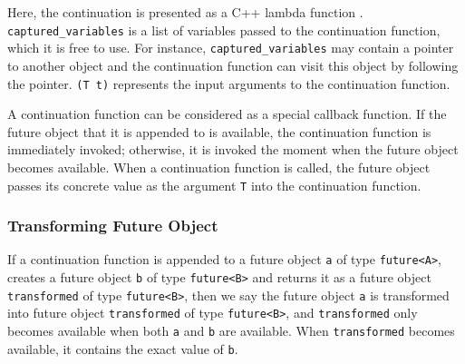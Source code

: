 \noindent Here, the continuation is presented as a C++ lambda function \cite{cpplambda}. \lstinline[style=InlineStyle]{captured_variables} is a list of variables passed to the continuation function, which it is free to use. For instance, \lstinline[style=InlineStyle]{captured_variables} may contain a pointer to another object and the continuation function can visit this object by following the pointer. %
 \lstinline[style=InlineStyle]{(T t)} represents the input arguments to the continuation function.

A continuation function can be considered as a special callback function. If the future object that it is appended to is available, the continuation function is immediately invoked; otherwise, it is invoked the moment when the future object becomes available. When a continuation function is called, the future object passes its concrete value as the argument \lstinline[style=InlineStyle]{T} into the continuation function. %

\subsubsection{Transforming Future Object}
\label{sec:tranform-future-object}

 If a continuation function is appended to a future object \lstinline[style=InlineStyle]{a} of type \lstinline[style=InlineStyle]{future<A>}, creates a future object \lstinline[style=InlineStyle]{b} of type \lstinline[style=InlineStyle]{future<B>} and returns it as a future object \lstinline[style=InlineStyle]{transformed} of type \lstinline[style=InlineStyle]{future<B>}, then we say the future object \lstinline[style=InlineStyle]{a} is transformed into future object \lstinline[style=InlineStyle]{transformed} of type \lstinline[style=InlineStyle]{future<B>}, and \lstinline[style=InlineStyle]{transformed} only becomes available when both \lstinline[style=InlineStyle]{a} and \lstinline[style=InlineStyle]{b} are available. %
When \lstinline[style=InlineStyle]{transformed} becomes available, it contains the exact value of \lstinline[style=InlineStyle]{b}. %

